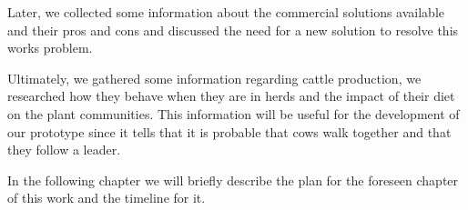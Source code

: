 Later, we collected some information about the commercial solutions available and their pros
and cons and discussed the need for a new solution to resolve this works problem.

Ultimately, we gathered some information regarding cattle production, we researched how they
behave when they are in herds and the impact of their diet on the plant communities. This
information will be useful for the development of our prototype since it tells that it is
probable that cows walk together and that they follow a leader.

In the following chapter we will briefly describe the plan for the foreseen chapter of this
work and the timeline for it.